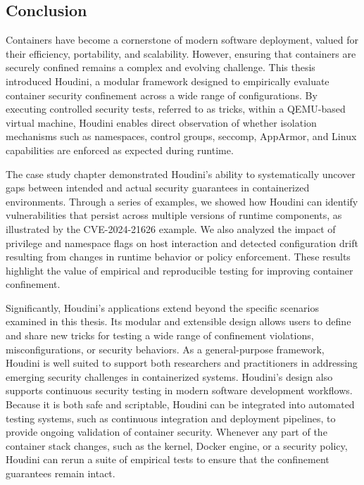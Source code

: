 \fontsize{12pt}{14pt} \selectfont
\begin{doublespace}
\chapter{Conclusion}

Containers have become a cornerstone of modern software deployment, valued for their efficiency, portability, and scalability. However, ensuring that containers are securely confined remains a complex and evolving challenge. This thesis introduced Houdini, a modular framework designed to empirically evaluate container security confinement across a wide range of configurations. By executing controlled security tests, referred to as tricks, within a QEMU-based virtual machine, Houdini enables direct observation of whether isolation mechanisms such as namespaces, control groups, seccomp, AppArmor, and Linux capabilities are enforced as expected during runtime.

The case study chapter demonstrated Houdini's ability to systematically uncover gaps between intended and actual security guarantees in containerized environments. Through a series of examples, we showed how Houdini can identify vulnerabilities that persist across multiple versions of runtime components, as illustrated by the CVE-2024-21626 example. We also analyzed the impact of privilege and namespace flags on host interaction and detected configuration drift resulting from changes in runtime behavior or policy enforcement. These results highlight the value of empirical and reproducible testing for improving container confinement.

Significantly, Houdini’s applications extend beyond the specific scenarios examined in this thesis. Its modular and extensible design allows users to define and share new tricks for testing a wide range of confinement violations, misconfigurations, or security behaviors. As a general-purpose framework, Houdini is well suited to support both researchers and practitioners in addressing emerging security challenges in containerized systems.
Houdini’s design also supports continuous security testing in modern software development workflows. Because it is both safe and scriptable, Houdini can be integrated into automated testing systems, such as continuous integration and deployment pipelines, to provide ongoing validation of container security. Whenever any part of the container stack changes, such as the kernel, Docker engine, or a security policy, Houdini can rerun a suite of empirical tests to ensure that the confinement guarantees remain intact.


\end{doublespace}
